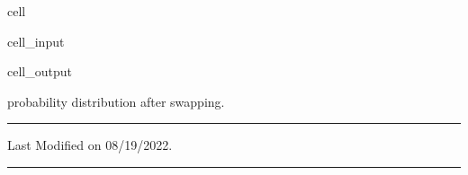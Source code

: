 \documentclass[letterpaper,10pt,english]{jupyterBook}
\begin{document}
\begin{sphinxuseclass}{cell}\begin{sphinxVerbatimInput}

\begin{sphinxuseclass}{cell_input}
\begin{sphinxVerbatim}[commandchars=\\\{\}]


  
   
    \PYG{p}{[}\PYG{p}{]}\PYG{p}{[}\PYG{p}{]}

\end{sphinxVerbatim}

\end{sphinxuseclass}\end{sphinxVerbatimInput}
\begin{sphinxVerbatimOutput}

\begin{sphinxuseclass}{cell_output}
\begin{sphinxVerbatim}[commandchars=\\\{\}]
probability distribution after swapping.
\end{sphinxVerbatim}

\noindent{}

\end{sphinxuseclass}\end{sphinxVerbatimOutput}

\end{sphinxuseclass}

\bigskip\hrule\bigskip


\sphinxAtStartPar
Last Modified on 08/19/2022.


\bigskip\hrule\bigskip
\end{document}
